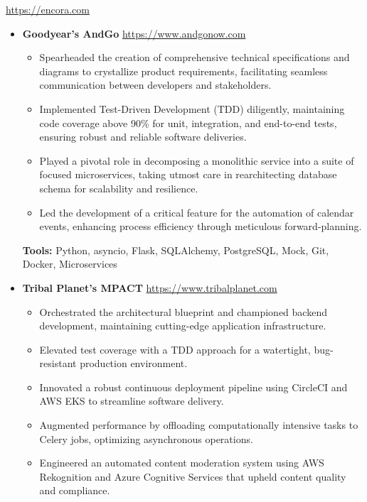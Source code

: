 \documentclass[11pt,a4paper,english]{moderncv}
\begin{document}
{
\url{https://encora.com}
\newline{}
\begin{itemize}
    \item \textbf{Goodyear's AndGo}
        \newline{}
        \url{https://www.andgonow.com}
        \begin{itemize}
            \item Spearheaded the creation of comprehensive technical specifications and diagrams to crystallize product requirements, facilitating seamless communication between developers and stakeholders.
            \item Implemented Test-Driven Development (TDD) diligently, maintaining code coverage above 90\% for unit, integration, and end-to-end tests, ensuring robust and reliable software deliveries.
            \item Played a pivotal role in decomposing a monolithic service into a suite of focused microservices, taking utmost care in rearchitecting database schema for scalability and resilience.
            \item Led the development of a critical feature for the automation of calendar events, enhancing process efficiency through meticulous forward-planning.
        \end{itemize}
        \textbf{Tools:} Python, asyncio, Flask, SQLAlchemy, PostgreSQL, Mock, Git, Docker, Microservices
    \item \textbf{Tribal Planet's MPACT}
        \newline{}
        \url{https://www.tribalplanet.com}
        \begin{itemize}
            \item Orchestrated the architectural blueprint and championed backend development, maintaining cutting-edge application infrastructure.
            \item Elevated test coverage with a TDD approach for a watertight, bug-resistant production environment.
            \item Innovated a robust continuous deployment pipeline using CircleCI and AWS EKS to streamline software delivery. 
            \item Augmented performance by offloading computationally intensive tasks to Celery jobs, optimizing asynchronous operations.
            \item Engineered an automated content moderation system using AWS Rekognition and Azure Cognitive Services that upheld content quality and compliance.

\end{itemize}
\end{itemize}}
\end{document}
